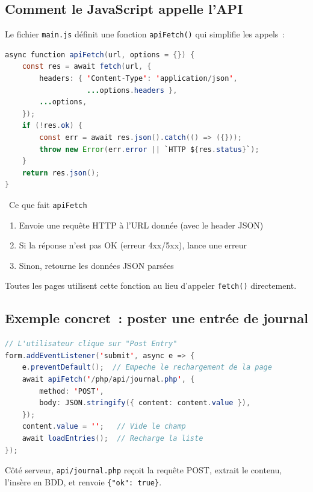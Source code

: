 \documentclass[12pt,a4paper]{article}
\begin{document}
\subsection{Comment le JavaScript appelle l'API}

Le fichier \texttt{main.js} définit une fonction \texttt{apiFetch()} qui simplifie les appels~:

\begin{lstlisting}[language=Java, title={\texttt{js/main.js} --- Fonction apiFetch}]
async function apiFetch(url, options = {}) {
    const res = await fetch(url, {
        headers: { 'Content-Type': 'application/json',
                   ...options.headers },
        ...options,
    });
    if (!res.ok) {
        const err = await res.json().catch(() => ({}));
        throw new Error(err.error || `HTTP ${res.status}`);
    }
    return res.json();
}
\end{lstlisting}

\begin{tipbox}{\faLightbulb\ Ce que fait \texttt{apiFetch}}
\begin{enumerate}
    \item Envoie une requête HTTP à l'URL donnée (avec le header JSON)
    \item Si la réponse n'est pas OK (erreur 4xx/5xx), lance une erreur
    \item Sinon, retourne les données JSON parsées
\end{enumerate}
Toutes les pages utilisent cette fonction au lieu d'appeler \texttt{fetch()} directement.
\end{tipbox}

\subsection{Exemple concret~: poster une entrée de journal}

\begin{lstlisting}[language=Java, title={Appel API depuis \texttt{journal.js}}]
// L'utilisateur clique sur "Post Entry"
form.addEventListener('submit', async e => {
    e.preventDefault();  // Empeche le rechargement de la page
    await apiFetch('/php/api/journal.php', {
        method: 'POST',
        body: JSON.stringify({ content: content.value }),
    });
    content.value = '';   // Vide le champ
    await loadEntries();  // Recharge la liste
});
\end{lstlisting}

Côté serveur, \texttt{api/journal.php} reçoit la requête POST, extrait le contenu, l'insère en BDD, et renvoie \texttt{\{"ok": true\}}.
\end{document}
